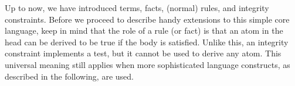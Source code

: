 
Up to now, we have introduced terms, facts, (normal) rules, and integrity constraints.
Before we proceed to describe handy extensions to this simple core language,
keep in mind that the role of a rule (or fact) is that an atom in the
head can be derived to be true if the body is satisfied.
Unlike this, an integrity constraint implements a test,
but it cannot be used to derive any atom.
This universal meaning still applies when more sophisticated language constructs,
as described in the following, are used.

%
%

